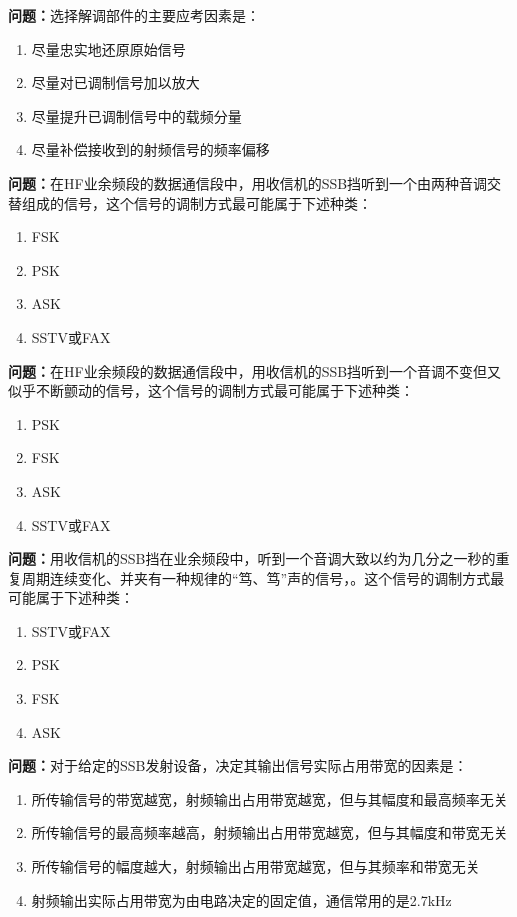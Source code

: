 \bigskip


\noindent\textbf{问题：}选择解调部件的主要应考因素是：
\begin{enumerate}[label=\Alph*), leftmargin=3em]
\item 尽量忠实地还原原始信号
\item 尽量对已调制信号加以放大
\item 尽量提升已调制信号中的载频分量
\item 尽量补偿接收到的射频信号的频率偏移
\end{enumerate}

\bigskip


\noindent\textbf{问题：}在HF业余频段的数据通信段中，用收信机的SSB挡听到一个由两种音调交替组成的信号，这个信号的调制方式最可能属于下述种类：
\begin{enumerate}[label=\Alph*), leftmargin=3em]
\item FSK
\item PSK
\item ASK
\item SSTV或FAX
\end{enumerate}

\bigskip


\noindent\textbf{问题：}在HF业余频段的数据通信段中，用收信机的SSB挡听到一个音调不变但又似乎不断颤动的信号，这个信号的调制方式最可能属于下述种类：
\begin{enumerate}[label=\Alph*), leftmargin=3em]
\item PSK
\item FSK
\item ASK
\item SSTV或FAX
\end{enumerate}

\bigskip


\noindent\textbf{问题：}用收信机的SSB挡在业余频段中，听到一个音调大致以约为几分之一秒的重复周期连续变化、并夹有一种规律的“笃、笃”声的信号，。这个信号的调制方式最可能属于下述种类：
\begin{enumerate}[label=\Alph*), leftmargin=3em]
\item SSTV或FAX
\item PSK
\item FSK
\item ASK
\end{enumerate}

\bigskip


\noindent\textbf{问题：}对于给定的SSB发射设备，决定其输出信号实际占用带宽的因素是：
\begin{enumerate}[label=\Alph*), leftmargin=3em]
\item 所传输信号的带宽越宽，射频输出占用带宽越宽，但与其幅度和最高频率无关
\item 所传输信号的最高频率越高，射频输出占用带宽越宽，但与其幅度和带宽无关
\item 所传输信号的幅度越大，射频输出占用带宽越宽，但与其频率和带宽无关
\item 射频输出实际占用带宽为由电路决定的固定值，通信常用的是2.7kHz
\end{enumerate}

